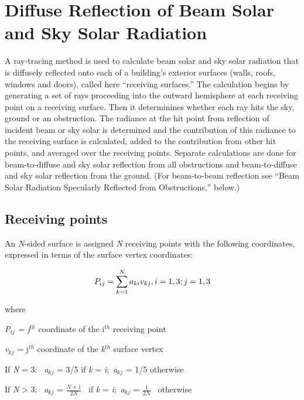 \section{Diffuse Reflection of Beam Solar and Sky Solar Radiation}\label{diffuse-reflection-of-beam-solar-and-sky-solar-radiation}

A ray-tracing method is used to calculate beam solar and sky solar radiation that is diffusely reflected onto each of a building's exterior surfaces (walls, roofs, windows and doors), called here ``receiving surfaces.'' The calculation begins by generating a set of rays proceeding into the outward hemisphere at each receiving point on a receiving surface. Then it determinines whether each ray hits the sky, ground or an obstruction. The radiance at the hit point from reflection of incident beam or sky solar is determined and the contribution of this radiance to the receiving surface is calculated, added to the contribution from other hit points, and averaged over the receiving points. Separate calculations are done for beam-to-diffuse and sky solar reflection from all obstructions and beam-to-diffuse and sky solar reflection from the ground. (For beam-to-beam reflection see ``Beam Solar Radiation Specularly Reflected from Obstructions,'' below.)

\subsection{Receiving points}\label{receiving-points}

An \emph{N}-sided surface is assigned \emph{N} receiving points with the following coordinates, expressed in terms of the surface vertex coordinates:

\begin{equation}
{P_{ij}} = \sum\limits_{k = 1}^N {{a_{ki}}{v_{kj}},{\rm{  }}i = 1,3;{\rm{  }}j = 1,3}
\end{equation}

where

\emph{P\(_{ij}\) = j\(^{th}\)} coordinate of the i\(^{th}\) receiving point

\emph{v\(_{kj}\)} = j\(^{th}\) coordinate of the \emph{k\(^{th}\)} surface vertex

If \emph{N} = 3:~ \emph{a\(_{kj}\)} = 3/5 if \emph{k} = \emph{i};~\emph{a\(_{kj}\)} = 1/5 otherwise

If \emph{N} \textgreater{} 3:~ \emph{a\(_{kj}\)} = \(\frac{{N + 1}}{{2N}}\) ~if \emph{k} = \emph{i};~\emph{a\(_{kj}\)} = \(\frac{1}{{2N}}\) ~otherwise

